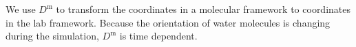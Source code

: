 We use ${{D}}^{\text{m}}$ to transform the coordinates in a molecular framework to coordinates in the lab framework. 
Because the orientation of water molecules is changing during the simulation, 
${{D}}^{\text{m}}$ is time dependent. 

